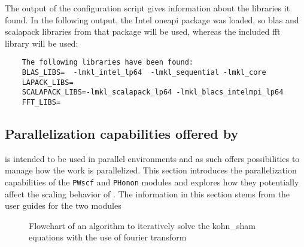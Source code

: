 \documentclass[main.tex]{subfiles}
\begin{document}
The output of the configuration script gives information about the libraries it found.
In the following output, the Intel \gls{oneapi} package was loaded, so \gls{blas} and \gls{scalapack} libraries from that package will be used, whereas the included \gls{fft} library will be used:
\begin{verbatim}
    The following libraries have been found:
    BLAS_LIBS=  -lmkl_intel_lp64  -lmkl_sequential -lmkl_core
    LAPACK_LIBS=
    SCALAPACK_LIBS=-lmkl_scalapack_lp64 -lmkl_blacs_intelmpi_lp64
    FFT_LIBS= 
\end{verbatim}

\subsection{Parallelization capabilities offered by \QE}\label{sub:qe_parallelization}

\QE is intended to be used in parallel environments and as such offers possibilities to manage how the work is parallelized.
This section introduces the parallelization capabilities of the \texttt{PWscf} and \texttt{PHonon} modules and explores how they potentially affect the scaling behavior of \QE. The information in this section stems from the user guides for the two modules \cite{noauthor_pwscf_nodate, noauthor_phonon_nodate}

\begin{figure}[ht!]
{}
\label{fig:diagram_scf_calculations}
\caption{Flowchart of an algorithm to iteratively solve the \acrshort{kohn_sham} equations with the use of fourier transform}
\end{figure}
\end{document}

